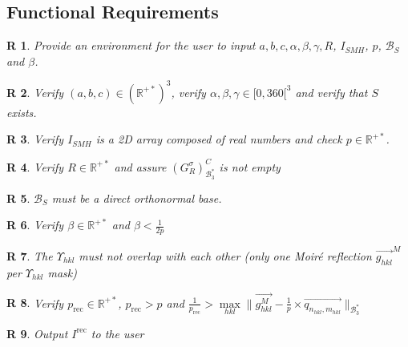 \documentclass[12pt]{article}
\newcommand\norm[1]{\lVert#1\rVert}
\newtheorem{R}{R}
\begin{document}
\subsection{Functional Requirements}

\begin{R}
\label{R_user_input}
\normalfont Provide an environment for the user to input 
 $a, b, c, \alpha, \beta, \gamma, R$, $I_{SMH}$, $p$, $\mathcal{B}_{S}$ and $\beta$.
\end{R}

\begin{R}
\label{R_verify_crystal}
\normalfont Verify $(a,b,c) \in {(\mathbb{R}^{+*})}^{3}$, verify $\alpha, \beta, \gamma \in [0,360[^{3}$ and verify that $S$ exists.
\end{R}

\begin{R}
\label{R_verify_SMH}
\normalfont Verify $I_{SMH}$ is a 2D array composed of real numbers and check $p \in \mathbb{R}^{+*}$.
\end{R}

\begin{R}
\label{R_crystal_resolved}
\normalfont Verify $R\in\mathbb{R}^{+*}$ and assure $(G^{\sigma}_{R})^{C}_{\mathcal{B}_{3}^{*}}$ is not empty
\end{R}

\begin{R}
\label{R_sampling_base}
\normalfont  $\mathcal{B}_{S}$ must be a direct orthonormal base.
\end{R}

\begin{R}
\label{R_mask_existence}
\normalfont Verify $\beta \in \mathbb{R}^{+*}$ and $\beta < \frac{1}{2p}$
\end{R}

\begin{R}
\label{R_reflection_isolated}
\normalfont The $\Upsilon_{hkl}$ must not overlap with each other (only one Moir{\'e} reflection $\overrightarrow{g_{hkl}}^{M}$ per $\Upsilon_{hkl}$ mask)
\end{R}

\begin{R}
\label{R_pixel_rec}
\normalfont Verify $p_{\text{rec}} \in \mathbb{R}^{+*}$, $p_{\text{rec}} > p$ and $ \frac{1}{p_{\text{rec}}} > \max\limits_{hkl} \norm{\overrightarrow{g_{hkl}^{M}} - \frac{1}{p} \times \overrightarrow{q_{n_{hkl},m_{hkl}}}}_{\mathcal{B}_{3}^{*}}$
\end{R}

\begin{R}
\label{R_output_rec}
\normalfont Output $I^{\text{rec}}$ to the user
\end{R}
\end{document}
